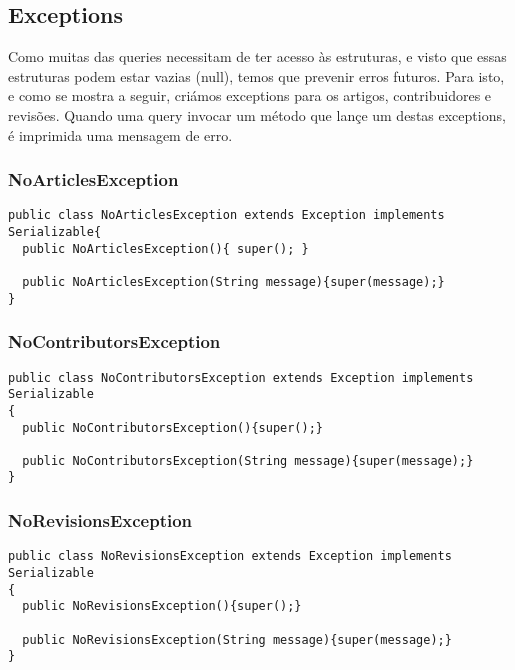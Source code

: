 \documentclass{article}
\begin{document}
\clearpage

\subsection{Exceptions}
\par Como muitas das queries necessitam de ter acesso às estruturas, e visto que essas estruturas podem estar vazias (null), temos que prevenir erros futuros. Para isto, e como se mostra a seguir, criámos exceptions para os artigos, contribuidores e revisões. Quando uma query invocar um método que lançe um destas exceptions, é imprimida uma mensagem de erro.

\subsubsection{NoArticlesException}

\begin{lstlisting}
public class NoArticlesException extends Exception implements Serializable{
  public NoArticlesException(){ super(); }

  public NoArticlesException(String message){super(message);}
}
\end{lstlisting}

\subsubsection{NoContributorsException}

\begin{lstlisting}
public class NoContributorsException extends Exception implements Serializable
{
  public NoContributorsException(){super();}

  public NoContributorsException(String message){super(message);}
}
\end{lstlisting}

\subsubsection{NoRevisionsException}
\begin{lstlisting}
public class NoRevisionsException extends Exception implements Serializable
{
  public NoRevisionsException(){super();}

  public NoRevisionsException(String message){super(message);}
}
\end{lstlisting}
\end{document}

